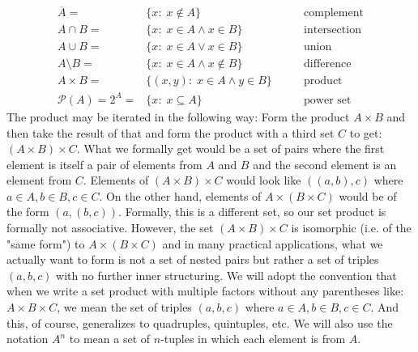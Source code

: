 \begin{eqnarray}
 \overline{A}  =& \{x: \; x \notin A \}                    \qquad &\text{complement} \\	
 A \cap B      =& \{x: \; x \in A \wedge x \in    B \}     \qquad &\text{intersection} \\
 A \cup B      =& \{x: \; x \in A \vee   x \in    B \}     \qquad &\text{union} \\
 A \setminus B =& \{x: \; x \in A \wedge x \notin B \}     \qquad &\text{difference} \\
 A \times B    =& \{(x,y): \; x \in A \wedge y \in    B \} \qquad &\text{product} \\
 \mathcal{P}(A) 
        = 2^A = &  \{x : \; x \subseteq A \}               \qquad &\text{power set}
\end{eqnarray}
The product may be iterated in the following way: Form the product $A \times B$ and then take the result of that and form the product with a third set $C$ to get: $(A \times B) \times C$. What we formally get would be a set of pairs where the first element is itself a pair of elements from $A$ and $B$ and the second element is an element from $C$. Elements of $(A \times B) \times C$ would look like $((a,b),c)$ where $a \in A, b \in B, c \in C$. On the other hand, elements of $A \times (B \times C)$ would be of the form $(a, (b,c))$. Formally, this is a different set, so our set product is formally not associative. However, the set $(A \times B) \times C$ is isomorphic (i.e. of the "same form") to $A \times (B \times C)$ and in many practical applications, what we actually want to form is not a set of nested pairs but rather a set of triples $(a,b,c)$ with no further inner structuring. We will adopt the convention that when we write a set product with multiple factors without any parentheses like: $A \times B \times C$, we mean the set of triples $(a,b,c)$ where $a \in A, b \in B, c \in C$. And this, of course, generalizes to quadruples, quintuples, etc. We will also use the notation $A^n$ to mean a set of $n$-tuples in which each element is from $A$. 


